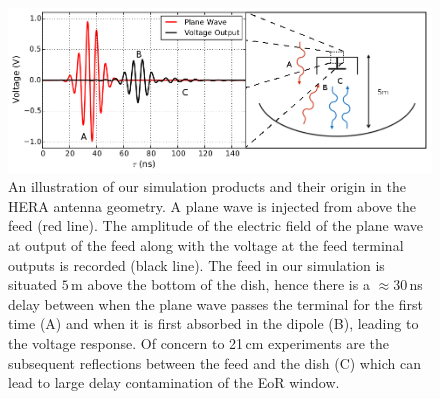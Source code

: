 \documentclass[twocolumn]{emulateapj}
\begin{document}
\begin{figure}
\includegraphics[width=\textwidth]{figures/SimulationIllustration.png}
\caption{An illustration of our simulation products and their origin in the HERA antenna geometry. A plane wave is injected from above the feed (red line). The amplitude of the electric field of the plane wave at output of the feed along with the voltage at the feed terminal outputs is recorded (black line). The feed in our simulation is situated $5$\,m above the bottom of the dish, hence there is a $\approx 30$\,ns delay between when the plane wave passes the terminal for the first time (A) and when it is first absorbed in the dipole (B), leading to the voltage response. Of concern to 21\,cm experiments are the subsequent reflections between the feed and the dish (C) which can lead to large delay contamination of the EoR window.}
\label{fig:Simulation}
\end{figure}
\end{document}
